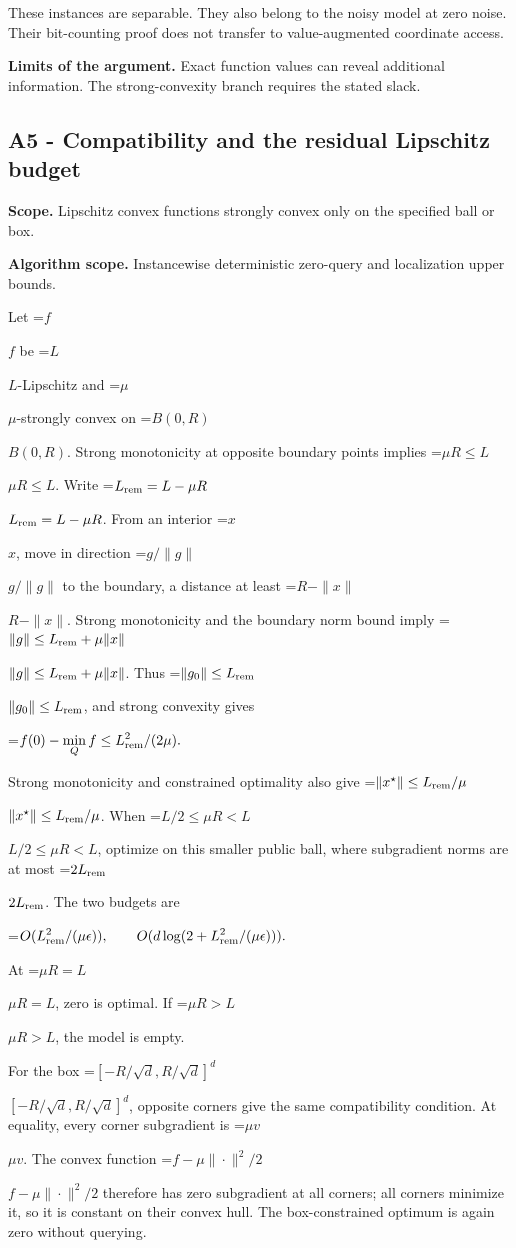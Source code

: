 \documentclass[10pt,a4paper]{article}
\newcommand{\AtlasMath}[1]{\par\begingroup\centering\setbox0=\hbox{$\displaystyle #1$}\ifdim\wd0>1.4\linewidth\typeout{ATLAS WIDE FORMULA: \the\wd0}\fi\ifdim\wd0>\linewidth\resizebox{\linewidth}{!}{\box0}\else\box0\fi\par\endgroup}
\newcommand{\AtlasInlineMath}[1]{\begingroup\setbox0=\hbox{$#1$}\ifdim\wd0>.4\linewidth\endgroup\AtlasMath{#1}\else\endgroup$#1$\fi}
\begin{document}
These instances are separable. They also belong to the noisy model at zero noise. Their bit-counting proof does not transfer to value-augmented coordinate access.

\textbf{Limits of the argument.} Exact function values can reveal additional information. The strong-convexity branch requires the stated slack.

\subsection{A5 - Compatibility and the residual Lipschitz budget}
\textbf{Scope.} Lipschitz convex functions strongly convex only on the specified ball or box.

\textbf{Algorithm scope.} Instancewise deterministic zero-query and localization upper bounds.

Let \AtlasInlineMath{f} be \AtlasInlineMath{L}-Lipschitz and \AtlasInlineMath{\mu}-strongly convex on \AtlasInlineMath{B(0,R)}. Strong monotonicity at opposite boundary points implies \AtlasInlineMath{\mu R\le L}. Write \AtlasInlineMath{L_{\rm rem}=L-\mu R}. From an interior \AtlasInlineMath{x}, move in direction \AtlasInlineMath{g/\|g\|} to the boundary, a distance at least \AtlasInlineMath{R-\|x\|}. Strong monotonicity and the boundary norm bound imply
\AtlasInlineMath{\|g\|\le L_{\rm rem}+\mu\|x\|}.
Thus \AtlasInlineMath{\|g_0\|\le L_{\rm rem}}, and strong convexity gives

\AtlasMath{f(0)-\min_Qf\le L_{\rm rem}^2/(2\mu).}

Strong monotonicity and constrained optimality also give \AtlasInlineMath{\|x^\star\|\le L_{\rm rem}/\mu}. When \AtlasInlineMath{L/2\le\mu R<L}, optimize on this smaller public ball, where subgradient norms are at most \AtlasInlineMath{2L_{\rm rem}}. The two budgets are

\AtlasMath{O(L_{\rm rem}^2/(\mu\epsilon)),\qquad
O(d\log(2+L_{\rm rem}^2/(\mu\epsilon))).}

At \AtlasInlineMath{\mu R=L}, zero is optimal. If \AtlasInlineMath{\mu R>L}, the model is empty.

For the box \AtlasInlineMath{[-R/\sqrt d,R/\sqrt d]^d}, opposite corners give the same compatibility condition. At equality, every corner subgradient is \AtlasInlineMath{\mu v}. The convex function \AtlasInlineMath{f-\mu\|\cdot\|^2/2} therefore has zero subgradient at all corners; all corners minimize it, so it is constant on their convex hull. The box-constrained optimum is again zero without querying.
\end{document}
